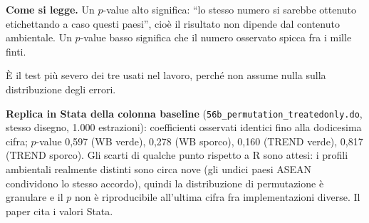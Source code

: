 \begin{table}[htbp]
\begin{threeparttable}
\begin{tablenotes}[flushleft]
\item \textbf{Come si legge.} Un $p$-value alto significa: ``lo stesso numero si sarebbe ottenuto etichettando a caso questi paesi'', cio\`e il risultato non dipende dal contenuto ambientale. Un $p$-value basso significa che il numero osservato spicca fra i mille finti.
\item \`E il test pi\`u severo dei tre usati nel lavoro, perch\'e non assume nulla sulla distribuzione degli errori.
\item \textbf{Replica in Stata della colonna baseline} (\texttt{56b\_permutation\_treatedonly.do}, stesso disegno, 1.000 estrazioni): coefficienti osservati identici fino alla dodicesima cifra; $p$-value 0,597 (WB verde), 0,278 (WB sporco), 0,160 (TREND verde), 0,817 (TREND sporco). Gli scarti di qualche punto rispetto a R sono attesi: i profili ambientali realmente distinti sono circa nove (gli undici paesi ASEAN condividono lo stesso accordo), quindi la distribuzione di permutazione \`e granulare e il $p$ non \`e riproducibile all'ultima cifra fra implementazioni diverse. Il paper cita i valori Stata.
\end{tablenotes}
\end{threeparttable}
\end{table}
